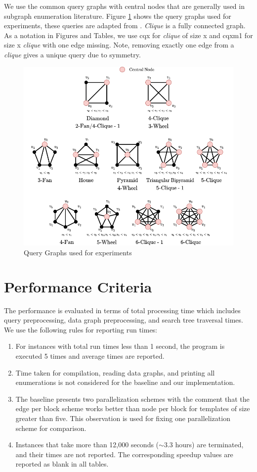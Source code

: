 We use the common query graphs with central nodes that are generally used in subgraph enumeration literature.
Figure \ref{fig:queries} shows the query graphs used for experiments, these queries are adapted from \cite{PARSEC_VD}.
\textit{Clique} is a fully connected graph.
As a notation in Figures and Tables, we use cqx for \textit{clique} of size x and cqxm1 for size x \textit{clique} with one edge missing. Note, removing exactly one edge from a \textit{clique} gives a unique query due to symmetry.
\begin{figure}[t]
    \includegraphics[width=\textwidth]{fig/improvements/Templates.png}
    \caption{Query Graphs used for experiments}
    \label{fig:queries}
\end{figure}

\section{Performance Criteria}
The performance is evaluated in terms of total processing time which includes query preprocessing, data graph preprocessing, and search tree traversal times.
We use the following rules for reporting run times:\
\begin{enumerate}
    \item For instances with total run times less than 1 second, the program is executed 5 times and average times are reported.
    \item Time taken for compilation, reading data graphs, and printing all enumerations is not considered for the baseline and our implementation.
    \item The baseline presents two parallelization schemes with the comment that the edge per block scheme works better than node per block for templates of size greater than five. This observation is used for fixing one parallelization scheme for comparison.
    \item Instances that take more than 12,000 seconds ($\sim 3.3$ hours) are terminated, and their times are not reported. The corresponding speedup values are reported as blank in all tables.
\end{enumerate}


